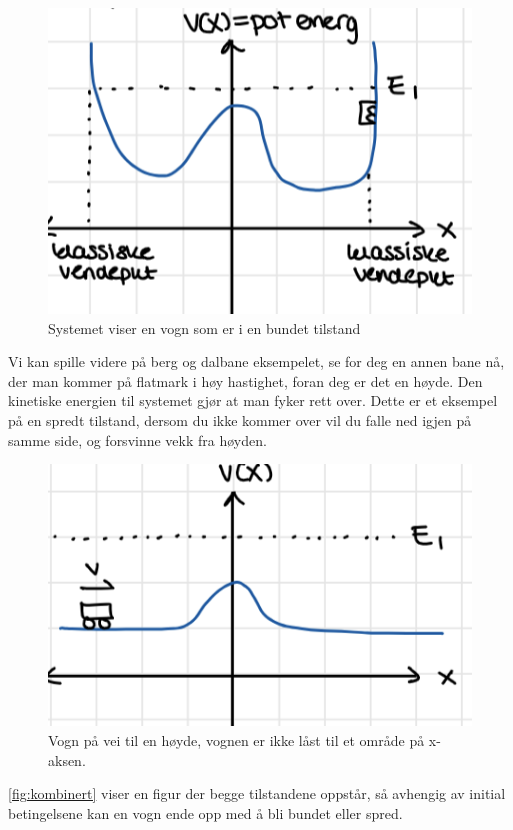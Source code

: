\begin{figure}[!htb]
    \centering
    \includegraphics[scale=1]{Bilder/SamtaleTema2/Bundet og spredde/bundneTilstander.png}
    \caption{Systemet viser en vogn som er i en bundet tilstand}
    \label{fig:bundet}
\end{figure}

Vi kan spille videre på berg og dalbane eksempelet, se for deg en annen bane nå, der man kommer på flatmark i høy hastighet, foran deg er det en høyde. Den kinetiske energien til systemet gjør at man fyker rett over. Dette er et eksempel på en spredt tilstand, dersom du ikke kommer over vil du falle ned igjen på samme side, og forsvinne vekk fra høyden.

\begin{figure}[!htb]
    \centering
    \includegraphics{Bilder/SamtaleTema2/Bundet og spredde/SpredteTilstander.png}
    \caption{Vogn på vei til en høyde, vognen er ikke låst til et område på x-aksen.}
    \label{fig:spredt}
\end{figure}
\newpage
\autoref{fig:kombinert} viser en figur der begge tilstandene oppstår, så avhengig av initial betingelsene kan en vogn ende opp med å bli bundet eller spred.

